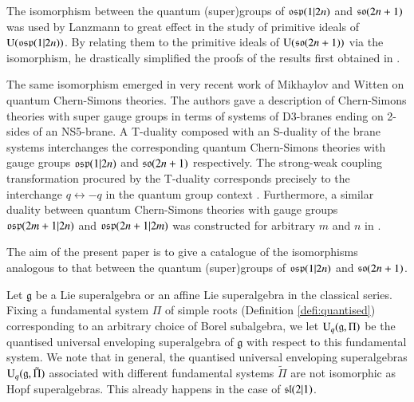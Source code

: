 \documentclass[12pt]{amsart}
\theoremstyle{definition}
\theoremstyle{remark}
\numberwithin{equation}{section}
\begin{document}
The isomorphism between the quantum (super)groups of ${{\rm\mathfrak{osp}}}(1|2n)$ and  ${{\rm\mathfrak{so}}}(2n+1)$ 
was used by Lanzmann to great effect \cite{LE} in the study of primitive ideals of ${{\rm U}}({{\rm\mathfrak{osp}}}(1|2n))$. 
By relating them to the primitive ideals of ${{\rm U}}({{\rm\mathfrak{so}}}(2n+1))$ via the isomorphism, he drastically simplified the proofs of the results first obtained in \cite{GL}.

The same isomorphism emerged in very recent work of Mikhaylov and Witten \cite{MW} on quantum Chern-Simons theories.
The authors gave a description of Chern-Simons theories with super gauge groups
in terms of systems of D3-branes ending on 2-sides of an NS5-brane.
A T-duality composed with an S-duality of the brane systems interchanges
the corresponding quantum Chern-Simons theories
with gauge groups ${{\rm\mathfrak{osp}}}(1|2n)$ and ${{\rm\mathfrak{so}}}(2n+1)$ respectively.
The strong-weak coupling transformation procured by the T-duality corresponds
precisely to the interchange $q\leftrightarrow  -q$ in the quantum group context \cite{Z3}. Furthermore,  a similar duality between
quantum Chern-Simons theories
with gauge groups ${{\rm\mathfrak{osp}}}(2m+1|2n)$ and  ${{\rm\mathfrak{osp}}}(2n+1|2m)$ was constructed for arbitrary $m$ and $n$ in \cite{MW}.

The aim of the present paper is to give a catalogue of the isomorphisms analogous to 
that between the quantum (super)groups of ${{\rm\mathfrak{osp}}}(1|2n)$ and  ${{\rm\mathfrak{so}}}(2n+1)$.

Let ${{\mathfrak g}}$ be a Lie superalgebra or an affine Lie superalgebra in the classical series.
Fixing a fundamental system $\Pi$
of simple roots (Definition \ref {defi:quantised})  corresponding to an arbitrary choice of Borel subalgebra, 
we let ${{\rm U}}_{q}({{\mathfrak g}}, \Pi)$ be the quantised universal enveloping superalgebra of ${{\mathfrak g}}$ with respect to this fundamental system. 
We note that in general, the quantised universal enveloping superalgebras ${{\rm U}}_{q}({{\mathfrak g}}, \tilde\Pi)$ associated with different fundamental systems $\tilde\Pi$
are not isomorphic as Hopf superalgebras.  This already happens in the case of ${{\rm\mathfrak{sl}}}(2|1)$. 
\end{document}
